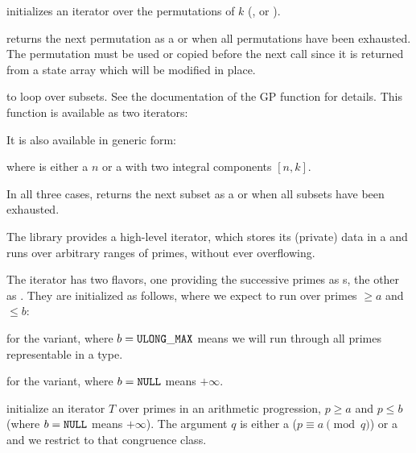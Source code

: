    initializes an iterator
  over the permutations of $k$ (,  or ).

   returns the next permutation
  as a  or  when all permutations have been
  exhausted. The permutation must be used or copied before the next call
  since it is returned from a state array which will be modified in place.

\item {} to loop over subsets. See the documentation
  of the  GP function for details. This function
  is available as two iterators:



  \noindent It is also available in generic form:

   where  is either
  a  $n$ or a  with two integral components $[n,k]$.

  In all three cases,  returns the
  next subset as a  or  when all subsets have been
  exhausted.

\label{se:primeiter}

The library provides a high-level iterator, which stores its (private) data
in a   and runs over arbitrary ranges of primes,
without ever overflowing.

The iterator has two flavors, one providing the successive primes as
s, the other as . They are initialized as follows,
where we expect to run over primes $\geq a$ and $\leq b$:

 for the
 variant, where $b = {\tt ULONG\_MAX}$ means we will run through
all primes representable in a  type.

 for the 
variant, where $b = {\tt NULL}$ means $+\infty$.

 initialize
an iterator $T$ over primes in an arithmetic progression, $p \geq a$ and $p
\leq b$ (where $b = {\tt NULL}$ means $+\infty$). The argument $q$ is
either a  ($p \equiv a \pmod{q}$) or a  
and we restrict to that congruence class.

